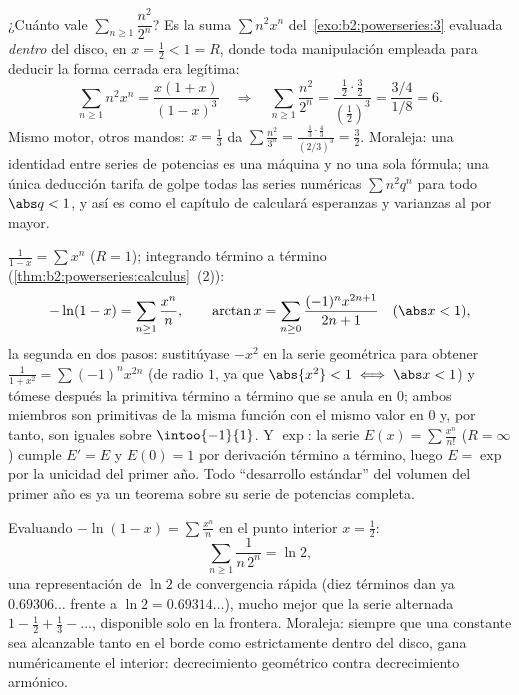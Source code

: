 \begin{example}\label{ex:b2:powerseries:evaluate}
¿Cuánto vale $\sum_{n\geq1}\dfrac{n^2}{2^n}$? Es la suma $\sum
n^2x^n$ del~\cref{exo:b2:powerseries:3} evaluada \emph{dentro} del
disco, en $x = \frac12 < 1 = R$, donde toda manipulación empleada
para deducir la forma cerrada era legítima:
\[
\sum_{n\geq1} n^2x^n = \frac{x(1+x)}{(1-x)^3}
\quad\Longrightarrow\quad
\sum_{n\geq1}\frac{n^2}{2^n}
= \frac{\frac12\cdot\frac32}{(\frac12)^3}
= \frac{3/4}{1/8} = 6 .
\]
Mismo motor, otros mandos: $x = \frac13$ da $\sum\frac{n^2}{3^n} =
\frac{\frac13\cdot\frac43}{(2/3)^3} = \frac32$. Moraleja: una
identidad entre series de potencias es una máquina y no una sola
fórmula; una única deducción tarifa de golpe todas las series
numéricas $\sum n^2q^n$ para todo $\abs q < 1$, y así es como el
capítulo de  calculará esperanzas y varianzas
al por mayor.
\end{example}

\begin{example}\label{ex:b2:powerseries:classics}
$\displaystyle\frac{1}{1 - x} = \sum x^n$ ($R = 1$); integrando
término a término (\cref{thm:b2:powerseries:calculus}~(2)):
\[
-\ln(1 - x) = \sum_{n\geq1} \frac{x^n}{n},
\qquad
\arctan x = \sum_{n \geq 0} \frac{(-1)^n x^{2n+1}}{2n+1}
\quad (\abs x < 1),
\]
la segunda en dos pasos: sustitúyase $-x^2$ en la serie geométrica
para obtener $\frac{1}{1+x^2} = \sum(-1)^nx^{2n}$ (de radio $1$, ya
que $\abs{x^2} < 1 \iff \abs x < 1$) y tómese después la primitiva
término a término que se anula en $0$; ambos miembros son primitivas
de la misma función con el mismo valor en $0$ y, por tanto, son
iguales sobre $\intoo{-1}{1}$. Y $\exp$: la serie $E(x) = \sum
\frac{x^n}{n!}$ ($R = \infty$) cumple $E' = E$ y $E(0) = 1$ por
derivación término a término, luego $E = \exp$ por la unicidad del
primer año. Todo ``desarrollo estándar'' del volumen del primer año
es ya un teorema sobre su serie de potencias completa.
\end{example}

\begin{example}\label{ex:b2:powerseries:lntwo}
Evaluando $-\ln(1-x) = \sum\frac{x^n}{n}$ en el punto interior $x =
\frac12$:
\[
\sum_{n\geq1}\frac{1}{n\,2^n} = \ln 2 ,
\]
una representación de $\ln 2$ de convergencia rápida (diez términos
dan ya $0.69306\ldots$ frente a $\ln 2 = 0.69314\ldots$), mucho
mejor que la serie alternada $1 - \frac12 + \frac13 - \dots$,
disponible solo en la frontera. Moraleja: siempre que una constante
sea alcanzable tanto en el borde como estrictamente dentro del
disco, gana numéricamente el interior: decrecimiento geométrico
contra decrecimiento armónico.
\end{example}

